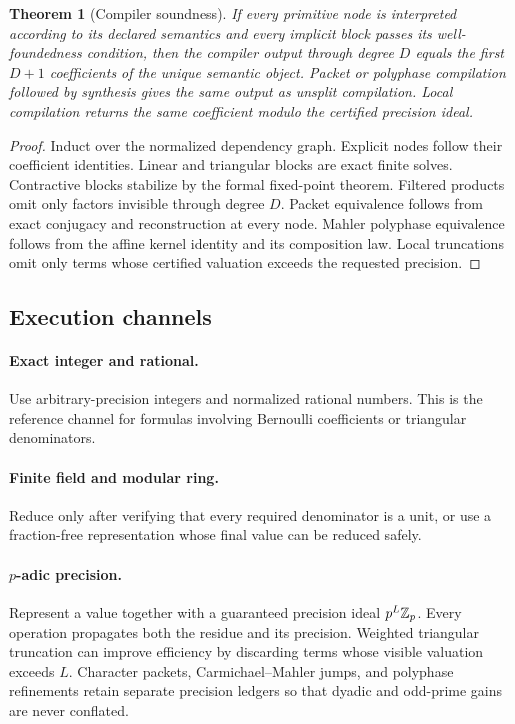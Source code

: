 \documentclass[11pt]{article}
\newtheorem{theorem}{Theorem}[section]\newtheorem{proposition}[theorem]{Proposition}\newtheorem{lemma}[theorem]{Lemma}\newtheorem{corollary}[theorem]{Corollary}
\theoremstyle{definition}\newtheorem{definition}[theorem]{Definition}\newtheorem{example}[theorem]{Example}\newtheorem{construction}[theorem]{Construction}\newtheorem{algorithm}[theorem]{Algorithm}\newtheorem{conjecture}[theorem]{Conjecture}\newtheorem{problem}[theorem]{Problem}
\theoremstyle{remark}\newtheorem{remark}[theorem]{Remark}\newtheorem{boundary}[theorem]{Boundary}\newtheorem{certificate}[theorem]{Computational Certificate}\newtheorem{classical}[theorem]{Classical Input}\newtheorem{principle}[theorem]{Structural Principle}
\begin{document}
\begin{theorem}[Compiler soundness]
If every primitive node is interpreted according to its declared semantics and every implicit block passes its well-foundedness condition, then the compiler output through degree $D$ equals the first $D+1$ coefficients of the unique semantic object.  Packet or polyphase compilation followed by synthesis gives the same output as unsplit compilation. Local compilation returns the same coefficient modulo the certified precision ideal.
\end{theorem}
\begin{proof}
Induct over the normalized dependency graph.  Explicit nodes follow their coefficient identities.  Linear and triangular blocks are exact finite solves.  Contractive blocks stabilize by the formal fixed-point theorem.  Filtered products omit only factors invisible through degree $D$.  Packet equivalence follows from exact conjugacy and reconstruction at every node. Mahler polyphase equivalence follows from the affine kernel identity and its composition law. Local truncations omit only terms whose certified valuation exceeds the requested precision.
\end{proof}

\subsection{Execution channels}
\paragraph{Exact integer and rational.}
Use arbitrary-precision integers and normalized rational numbers.  This is the reference channel for formulas involving Bernoulli coefficients or triangular denominators.

\paragraph{Finite field and modular ring.}
Reduce only after verifying that every required denominator is a unit, or use a fraction-free representation whose final value can be reduced safely.

\paragraph{$p$-adic precision.}
Represent a value together with a guaranteed precision ideal $p^L\mathbb Z_p$.  Every operation propagates both the residue and its precision.  Weighted triangular truncation can improve efficiency by discarding terms whose visible valuation exceeds $L$. Character packets, Carmichael--Mahler jumps, and polyphase refinements retain separate precision ledgers so that dyadic and odd-prime gains are never conflated.
\end{document}
